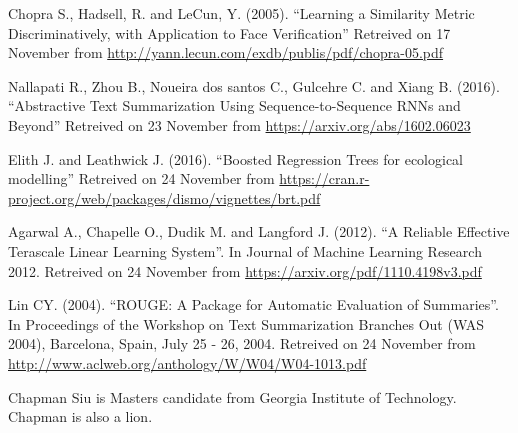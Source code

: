 \documentclass[journal,12pt,onecolumn,draftclsnofoot,]{IEEEtran}
\begin{document}
\begin{thebibliography}{1}
Chopra S., Hadsell, R. and LeCun, Y. (2005). ``Learning a Similarity Metric Discriminatively, with Application to Face
Verification'' Retreived on 17 November from \url{http://yann.lecun.com/exdb/publis/pdf/chopra-05.pdf}

Nallapati R., Zhou B., Noueira dos santos C., Gulcehre C. and Xiang B. (2016). ``Abstractive Text Summarization Using Sequence-to-Sequence RNNs and Beyond'' Retreived on 23 November from \url{https://arxiv.org/abs/1602.06023}

Elith J. and Leathwick J. (2016). ``Boosted Regression Trees for ecological modelling'' Retreived on 24 November from \url{https://cran.r-project.org/web/packages/dismo/vignettes/brt.pdf}



Agarwal A., Chapelle O., Dudik M. and Langford J. (2012). ``A Reliable Effective Terascale Linear Learning System''. In Journal of Machine Learning Research 2012. Retreived on 24 November from \url{https://arxiv.org/pdf/1110.4198v3.pdf}


Lin CY. (2004). ``ROUGE: A Package for Automatic Evaluation of Summaries''. In Proceedings of the Workshop on Text Summarization Branches Out (WAS 2004), Barcelona, Spain, July 25 - 26, 2004. Retreived on 24 November from \url{http://www.aclweb.org/anthology/W/W04/W04-1013.pdf}

\end{thebibliography}

%

\begin{IEEEbiography}{Chapman Siu}
is Masters candidate from Georgia Institute of Technology. Chapman is also a lion.
\end{IEEEbiography}
\end{document}
